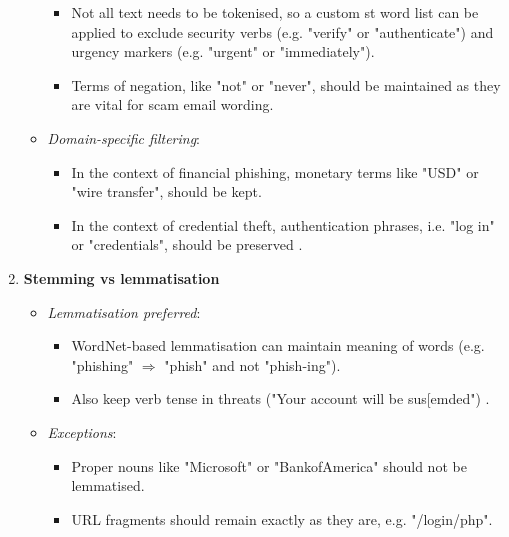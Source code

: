 \begin{enumerate}
\begin{itemize}
\begin{itemize}
      \item Not all text needs to be tokenised, so a custom st word list can be applied to exclude security verbs (e.g. "verify" or "authenticate") and urgency markers (e.g. "urgent" or "immediately").
      \item Terms of negation, like "not" or "never", should be maintained as they are vital for scam email wording.
    \end{itemize}
    \item \textit{Domain-specific filtering}:
    \begin{itemize}
      \item In the context of financial phishing, monetary terms like "USD" or "wire transfer", should be kept.
      \item In the context of credential theft, authentication phrases, i.e. "log in" or "credentials", should be preserved \citep{bravo2010bridging}.
    \end{itemize}
  \end{itemize}
  \item \textbf{Stemming vs lemmatisation}
  \begin{itemize}
    \item \textit{Lemmatisation preferred}:
    \begin{itemize}
      \item WordNet-based lemmatisation can maintain meaning of words (e.g. "phishing" $\Rightarrow$ "phish" and not "phish-ing").
      \item Also keep verb tense in threats ("Your account will be sus[emded") \citep{martens2014explaining}.
    \end{itemize}
    \item \textit{Exceptions}:
    \begin{itemize}
      \item Proper nouns like "Microsoft" or "BankofAmerica" should not be lemmatised.
      \item URL fragments should remain exactly as they are, e.g. "/login/php".
    \end{itemize}
  \end{itemize}
\end{enumerate}
